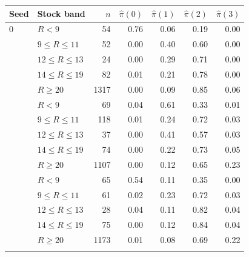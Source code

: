 \begin{tabular}{llrrrrr}
\toprule
Seed & Stock band & $n$ & $\hat\pi(0)$ & $\hat\pi(1)$ & $\hat\pi(2)$ & $\hat\pi(3)$ \\
\midrule
0 & $R<9$ & 54 & 0.76 & 0.06 & 0.19 & 0.00 \\
 & $9\le R\le 11$ & 52 & 0.00 & 0.40 & 0.60 & 0.00 \\
 & $12\le R\le 13$ & 24 & 0.00 & 0.29 & 0.71 & 0.00 \\
 & $14\le R\le 19$ & 82 & 0.01 & 0.21 & 0.78 & 0.00 \\
 & $R\ge 20$ & 1317 & 0.00 & 0.09 & 0.85 & 0.06 \\
\addlinespace
1 & $R<9$ & 69 & 0.04 & 0.61 & 0.33 & 0.01 \\
 & $9\le R\le 11$ & 118 & 0.01 & 0.24 & 0.72 & 0.03 \\
 & $12\le R\le 13$ & 37 & 0.00 & 0.41 & 0.57 & 0.03 \\
 & $14\le R\le 19$ & 74 & 0.00 & 0.22 & 0.73 & 0.05 \\
 & $R\ge 20$ & 1107 & 0.00 & 0.12 & 0.65 & 0.23 \\
\addlinespace
2 & $R<9$ & 65 & 0.54 & 0.11 & 0.35 & 0.00 \\
 & $9\le R\le 11$ & 61 & 0.02 & 0.23 & 0.72 & 0.03 \\
 & $12\le R\le 13$ & 28 & 0.04 & 0.11 & 0.82 & 0.04 \\
 & $14\le R\le 19$ & 75 & 0.00 & 0.12 & 0.84 & 0.04 \\
 & $R\ge 20$ & 1173 & 0.01 & 0.08 & 0.69 & 0.22 \\
\addlinespace
\bottomrule
\end{tabular}
